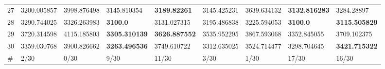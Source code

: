 \begin{table*}[t]
\begin{tabular}{|p{0.8cm}|p{1.6cm}|p{1.6cm}|p{1.6cm}|p{1.6cm}|p{1.6cm}|p{1.6cm}|p{1.6cm}|p{1.6cm}|}
27  & 3200.005857 & 3998.876498 & 3145.810354 & \textbf{3189.82261} & 3145.425231 & 3639.634132 & \textbf{3132.816283} & 3284.28897 \\ 
28  & 3290.744025 & 3326.263983 & \textbf{3100.0} & 3131.027315 & 3195.486838 & 3225.594053 & \textbf{3100.0} & \textbf{3115.505829} \\ 
29  & 3720.314598 & 4115.185803 & \textbf{3305.310139} & \textbf{3626.887552} & 3535.952295 & 3867.593068 & 3352.845055 & 3709.102375 \\ 
30  & 3359.030768 & 3900.826662 & \textbf{3263.496536} & 3749.610722 & 3312.635025 & 3524.714477 & 3298.704645 & \textbf{3421.715322} \\ 
\hline
\#  & 2/30 & 0/30 & 9/30 & 11/30 & 3/30 & 1/30 & 17/30 & 16/30 \\
\hline
\end{tabular}
\end{table*}
\endgroup

